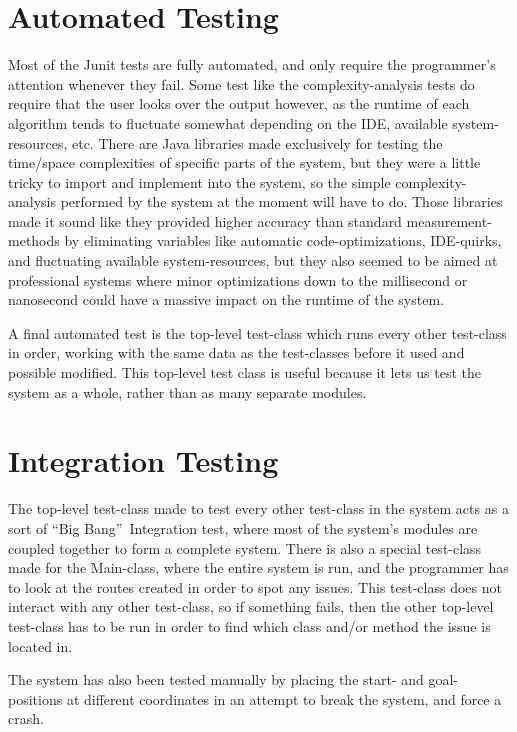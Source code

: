 \section{Automated Testing}
Most of the Junit tests are fully automated, and only require the programmer's attention whenever they fail. Some test like the complexity-analysis tests do require that the user looks over the output however, as the runtime of each algorithm tends to fluctuate somewhat depending on the IDE, available system-resources, etc. There are Java libraries made exclusively for testing the time/space complexities of specific parts of the system, but they were a little tricky to import and implement into the system, so the simple complexity-analysis performed by the system at the moment will have to do. Those libraries made it sound like they provided higher accuracy than standard measurement-methods by eliminating variables like automatic code-optimizations, IDE-quirks, and fluctuating available system-resources, but they also seemed to be aimed at professional systems where minor optimizations down to the millisecond or nanosecond could have a massive impact on the runtime of the system.

A final automated test is the top-level test-class which runs every other test-class in order, working with the same data as the test-classes before it used and possible modified. This top-level test class is useful because it lets us test the system as a whole, rather than as many separate modules.

\section{Integration Testing}
The top-level test-class made to test every other test-class in the system acts as a sort of \textquotedblleft Big Bang\textquotedblright~Integration test, where most of the system's modules are coupled together to form a complete system. There is also a special test-class made for the Main-class, where the entire system is run, and the programmer has to look at the routes created in order to spot any issues. This test-class does not interact with any other test-class, so if something fails, then the other top-level test-class has to be run in order to find which class and/or method the issue is located in.

The system has also been tested manually by placing the start- and goal-positions at different coordinates in an attempt to break the system, and force a crash.

